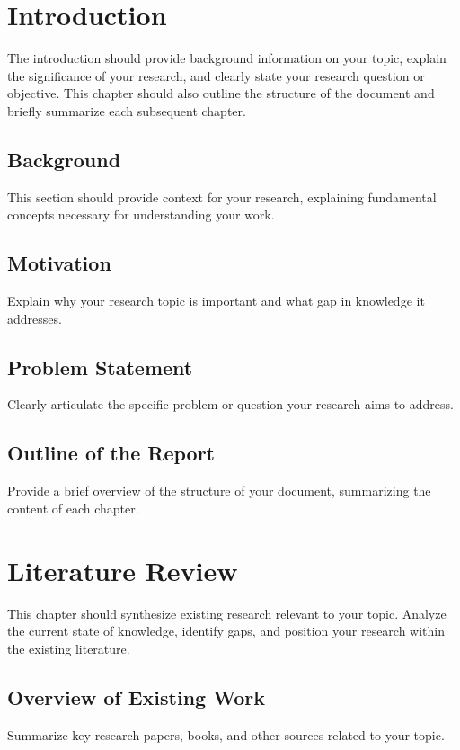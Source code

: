 \documentclass[12pt,a4paper]{report}
\begin{document}
\chapter{Introduction}
\label{chap:introduction}

The introduction should provide background information on your topic, explain the significance of your research, and clearly state your research question or objective. This chapter should also outline the structure of the document and briefly summarize each subsequent chapter. 
\section{Background}
This section should provide context for your research, explaining fundamental concepts necessary for understanding your work. 

\section{Motivation}
Explain why your research topic is important and what gap in knowledge it addresses.

\section{Problem Statement}
Clearly articulate the specific problem or question your research aims to address.

\section{Outline of the Report}
Provide a brief overview of the structure of your document, summarizing the content of each chapter.

\chapter{Literature Review}
This chapter should synthesize existing research relevant to your topic. Analyze the current state of knowledge, identify gaps, and position your research within the existing literature.

\section{Overview of Existing Work}
Summarize key research papers, books, and other sources related to your topic.
\end{document}
